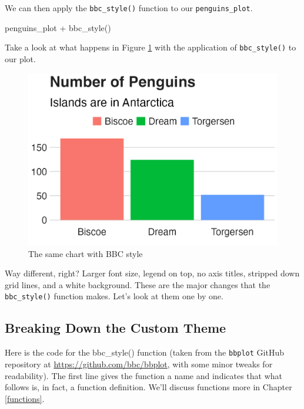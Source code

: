 \documentclass[
]{book}
\newenvironment{Shaded}{\begin{snugshade}}{\end{snugshade}}
\newcommand{\FunctionTok}[1]{\textcolor[rgb]{0.00,0.00,0.00}{#1}}
\newcommand{\NormalTok}[1]{#1}
\newcommand{\SpecialCharTok}[1]{\textcolor[rgb]{0.00,0.00,0.00}{#1}}
\begin{document}
We can then apply the \texttt{bbc\_style()} function to our \texttt{penguins\_plot}.

\begin{Shaded}
\begin{Highlighting}[]
\NormalTok{penguins\_plot }\SpecialCharTok{+}
  \FunctionTok{bbc\_style}\NormalTok{()}
\end{Highlighting}
\end{Shaded}

Take a look at what happens in Figure \ref{fig:penguins-bbc-style-plot} with the application of \texttt{bbc\_style()} to our plot.

\begin{figure}
\includegraphics[width=1\linewidth]{custom-theme_files/figure-latex/penguins-bbc-style-plot-1} \caption{The same chart with BBC style}\label{fig:penguins-bbc-style-plot}
\end{figure}

Way different, right? Larger font size, legend on top, no axis titles, stripped down grid lines, and a white background. These are the major changes that the \texttt{bbc\_style()} function makes. Let's look at them one by one.

\hypertarget{breaking-down-the-custom-theme}{%
\subsection*{Breaking Down the Custom Theme}\label{breaking-down-the-custom-theme}}

Here is the code for the bbc\_style() function (taken from the \texttt{bbplot} GitHub repository at \url{https://github.com/bbc/bbplot}, with some minor tweaks for readability). The first line gives the function a name and indicates that what follows is, in fact, a function definition. We'll discuss functions more in Chapter \ref{functions}.
\end{document}
